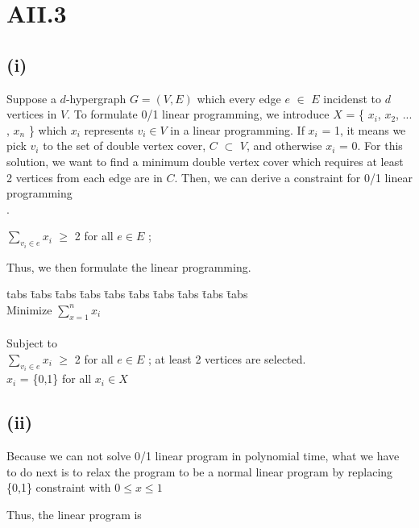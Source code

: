 \section* {AII.3}
\label {a2-3}
\subsection*{(i)}

Suppose a $d$-hypergraph $G = (V,E)$ which every edge $e$ $\in$ $E$ incidenst to $d$ vertices in $V$. To formulate 0/1 linear programming, we introduce $X$ = \{ $x{_i}$, $x{_2}$, ... , $x{_n}$ \} which $x{_i}$ represents $v_i \in V$ in a linear programming.
If $x_i$ = 1, it means we pick $v_i$ to the set of double vertex cover, $C$ $\subset$ $V$, and otherwise $x_i$ = 0. For this solution, we want to find a minimum double vertex cover which requires at least 2 vertices from each edge are in $C$. Then, we can derive a constraint for 0/1 linear programming\\.

\begin{center}
$\sum\limits_{v_{i} \in e} x_i$ $\geq$ 2 for all $e \in E$ ;
\end{center}



Thus, we then formulate the linear programming.

\begin{tabbing}
	tabs \= tabs \= tabs \= tabs \= tabs \= tabs \= tabs \= tabs \= tabs \= tabs \kill \\ 
	\> \> Minimize \>\>\>\>\>$\sum\limits_{x=1}^n x_i$  \\ \\
	\> \> Subject to \\
	\> \> \> \> $\sum\limits_{v_{i} \in e} x_i$ $\geq$ 2 \> \> \> for all $e \in E$ ; at least 2 vertices are selected.\\
	\> \> \> \> $x_i$ = \{0,1\} \> \> \> for all $x_i \in X$ \\
\end{tabbing}

\subsection*{(ii)}

Because we can not solve 0/1 linear program in polynomial time, what we have to do next is to relax the program to be a normal
linear program by replacing \{0,1\} constraint with
$0 \leq x \leq 1$

Thus, the linear program is

